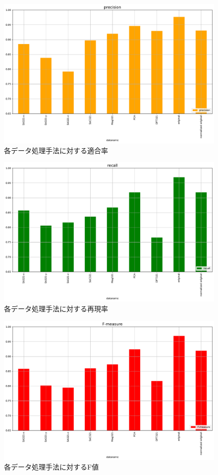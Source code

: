 \begin{figure}[H]
    \begin{center}
    \includegraphics[width=12cm]{eps/precision.pdf}
    \caption{各データ処理手法に対する適合率}
    \label{fig:precision}
   \end{center}
   \end{figure}

\begin{figure}[H]
    \begin{center}
    \includegraphics[width=12cm]{eps/recall.pdf}
    \caption{各データ処理手法に対する再現率}
    \label{fig:recall}
   \end{center}
   \end{figure}
   
\begin{figure}[H]
    \begin{center}
    \includegraphics[width=12cm]{eps/F-measure.pdf}
    \caption{各データ処理手法に対するF値}
    \label{fig:fmeasure}
   \end{center}
   \end{figure}


